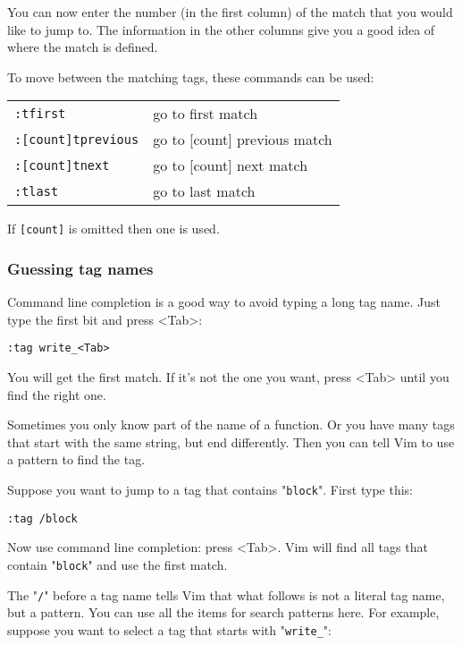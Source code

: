You can now enter the number (in the first column) of the match that you would like to jump to.
The information in the other columns give you a good idea of where the match is defined.

To move between the matching tags, these commands can be used:

\begin{center} \begin{tabular}{l l}
				\verb!:tfirst! & go to first match \\
				\verb!:[count]tprevious! & go to [count] previous match \\
				\verb!:[count]tnext! & go to [count] next match \\
				\verb!:tlast! & go to last match \\
\end{tabular} \end{center}

If \verb![count]! is omitted then one is used.
\subsubsection{Guessing tag names}
Command line completion is a good way to avoid typing a long tag name.
Just type the first bit and press <Tab>:

\begin{Verbatim}[samepage=true]
 :tag write_<Tab>
\end{Verbatim}

You will get the first match.
If it's not the one you want, press <Tab> until you find the right one.

Sometimes you only know part of the name of a function.
Or you have many tags that start with the same string, but end differently.
Then you can tell Vim to use a pattern to find the tag.

Suppose you want to jump to a tag that contains "\verb!block!".
First type this:

\begin{Verbatim}[samepage=true]
 :tag /block
\end{Verbatim}

Now use command line completion: press <Tab>.
Vim will find all tags that contain "\verb!block!" and use the first match.

The "\verb!/!" before a tag name tells Vim that what follows is not a literal tag name, but a pattern.
You can use all the items for search patterns here.
For example, suppose you want to select a tag that starts with "\verb!write_!":

